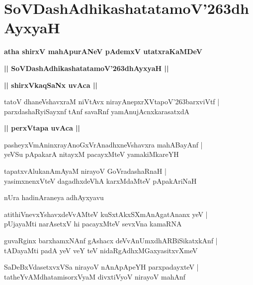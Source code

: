 \documentclass[twoside,12pt,openright]{book}
\def\S{\char'263}
\newcounter{shloka}[chapter]
\def\uvaca#1{\centerline{{\large\textbf{#1}}}}
\begin{document}
\chapter{SoVDashAdhikashatatamoV\S dhAyxyaH}

\begin{center}
{\LARGE\bfseries atha shirxV mahApurANeV pAdemxV utatxraKaMDeV}
\end{center}

\begin{center}
{\LARGE\bfseries || SoVDashAdhikashatatamoV\S dhAyxyaH || }
\end{center}

\uvaca{|| shirxVkaqSaNx uvAca ||}

\begin{shloka}%
tatoV dhaneVshavxraM niVtAvx nirayAnepxrXVtapoV\S barxviVtf |\\
parxdashaRyiSayxnf tAnf savaRnf yamAnujAcnxkarasatxdA 
\end{shloka}

\uvaca{|| perxVtapa uvAca ||}

\begin{shloka}%
pasheyxVmAninxrayAnoGxVrAnadhxneVshavxra mahABayAnf |\\
yeVSu pApakarA nitayxM pacayxMteV yamakiMkareYH 
\end{shloka}

\begin{shloka}%
tapatxvAlukanAmAyaM nirayoV GoVradashaRnaH |\\
yasimxnenxVteV dagadhxdeVhA karxMdaMteV pApakAriNaH 
\end{shloka}

\begin{center}
nUra hadinAraneya adhAyxyavu 
\end{center}

\begin{shloka}%
atithiVnevxYshavxdeVvAMteV kuSxtAkxSXmAnAgatAnanx yeV |\\
pUjayaMti narAsetxV hi pacayxMteV sevxVna kamaRNA
\end{shloka}

\begin{shloka}%
guvaRginx barxhamxNAnf gAshacx deVvAnUmxdhARBiSikatxkAnf |\\
tADayaMti padA yeV veY teV nidaRgAdhxMGaxyasitxvXmeV 
\end{shloka}

\begin{shloka}%
SaDeBxVdasetxvxVSa nirayoV nAnApApeYH parxpadayxteV |\\
tatheYvAMdhatamisorxVyaM divxtiVyoV nirayoV mahAnf 
\end{shloka}
\end{document}
